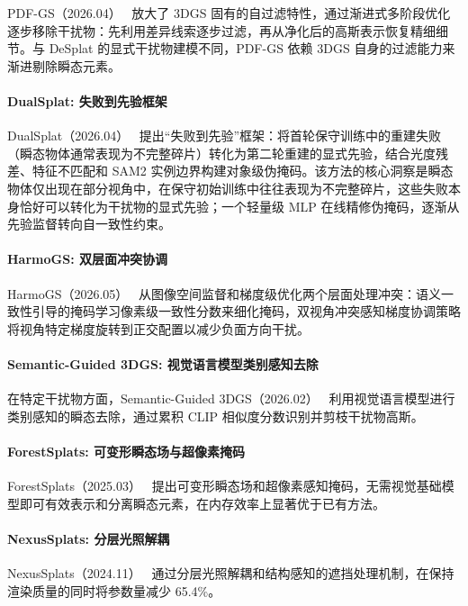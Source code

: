 PDF-GS（2026.04）~\cite{2604_12580} 放大了 3DGS 固有的自过滤特性，通过渐进式多阶段优化逐步移除干扰物：先利用差异线索逐步过滤，再从净化后的高斯表示恢复精细细节。与 DeSplat 的显式干扰物建模不同，PDF-GS 依赖 3DGS 自身的过滤能力来渐进剔除瞬态元素。

\paragraph{DualSplat: 失败到先验框架}

DualSplat（2026.04）~\cite{2604_21631} 提出``失败到先验''框架：将首轮保守训练中的重建失败（瞬态物体通常表现为不完整碎片）转化为第二轮重建的显式先验，结合光度残差、特征不匹配和 SAM2 实例边界构建对象级伪掩码。该方法的核心洞察是瞬态物体仅出现在部分视角中，在保守初始训练中往往表现为不完整碎片，这些失败本身恰好可以转化为干扰物的显式先验；一个轻量级 MLP 在线精修伪掩码，逐渐从先验监督转向自一致性约束。

\paragraph{HarmoGS: 双层面冲突协调}

HarmoGS（2026.05）~\cite{2605_13073} 从图像空间监督和梯度级优化两个层面处理冲突：语义一致性引导的掩码学习像素级一致性分数来细化掩码，双视角冲突感知梯度协调策略将视角特定梯度旋转到正交配置以减少负面方向干扰。

\paragraph{Semantic-Guided 3DGS: 视觉语言模型类别感知去除}

在特定干扰物方面，Semantic-Guided 3DGS（2026.02）~\cite{2602_15516} 利用视觉语言模型进行类别感知的瞬态去除，通过累积 CLIP 相似度分数识别并剪枝干扰物高斯。

\paragraph{ForestSplats: 可变形瞬态场与超像素掩码}

ForestSplats（2025.03）~\cite{2503_06179} 提出可变形瞬态场和超像素感知掩码，无需视觉基础模型即可有效表示和分离瞬态元素，在内存效率上显著优于已有方法。

\paragraph{NexusSplats: 分层光照解耦}

NexusSplats（2024.11）~\cite{2411_14514} 通过分层光照解耦和结构感知的遮挡处理机制，在保持渲染质量的同时将参数量减少 65.4\%。

